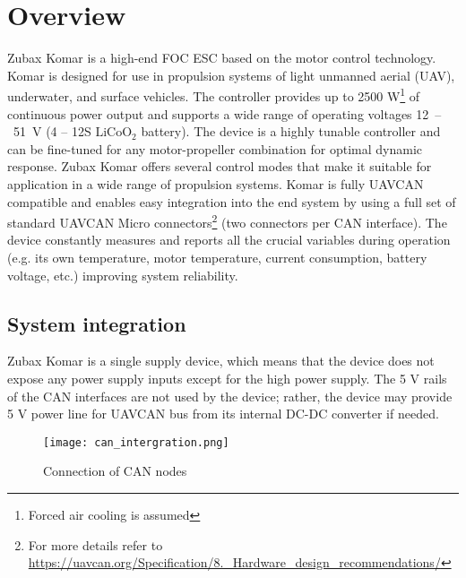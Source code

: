 \chapter{Overview}

Zubax Komar is a high-end FOC ESC based on the  motor control technology.
Komar is designed for use in propulsion systems of light unmanned aerial (UAV), underwater, and surface vehicles.
The controller provides up to 2500 W\footnote{Forced air cooling is assumed}
of continuous power output and supports a wide range of operating voltages
\mbox{12 -- 51 V} (4 -- 12S $\text{LiCoO}_\text{2}$ battery).
The device is a highly tunable controller and can be fine-tuned for any motor-propeller combination
for optimal dynamic response.
Zubax Komar offers several control modes that make it suitable for application in a wide range of propulsion systems.
Komar is fully UAVCAN compatible and enables easy integration into the end system by using a full set
of standard UAVCAN Micro connectors\footnote{For more details refer to
\url{https://uavcan.org/Specification/8._Hardware_design_recommendations/}} (two connectors per CAN interface).
The device constantly measures and reports all the crucial variables during operation
(e.g. its own temperature, motor temperature, current consumption, battery voltage, etc.)
improving system reliability.

\section{System integration}
Zubax Komar is a single supply device, which means that the device does not expose any power supply inputs except
for the high power supply. The 5 V rails of the CAN interfaces are not used by the device;
rather, the device may provide 5 V power line for UAVCAN bus from its internal DC-DC converter if needed.

\begin{figure}[h]
    \centering
    \texttt{[image: can\_intergration.png]}
    \caption{Connection of CAN nodes}
\end{figure}
